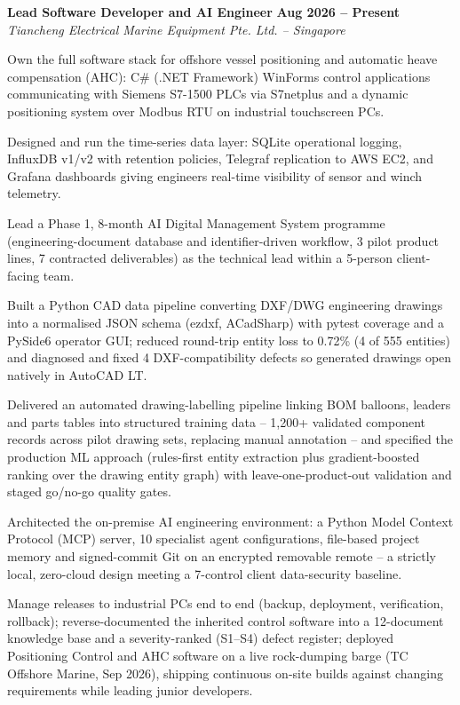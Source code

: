 \documentclass[letterpaper,10pt]{article}
\newcommand{\role}[4]{%
  \textbf{#1} \hfill \textbf{#3}\\
  \textit{#2} \hfill \textit{#4}\\[2pt]
}
\begin{document}
\role{Lead Software Developer and AI Engineer}
     {Tiancheng Electrical Marine Equipment Pte. Ltd. -- Singapore}
     {Aug 2026 -- Present}{}
\begin{tight}
  \item Own the full software stack for offshore vessel positioning and automatic heave
  compensation (AHC): C\# (.NET Framework) WinForms control applications communicating with
  Siemens S7-1500 PLCs via S7netplus and a dynamic positioning system over Modbus RTU on
  industrial touchscreen PCs.
  \item Designed and run the time-series data layer: SQLite operational logging, InfluxDB
  v1/v2 with retention policies, Telegraf replication to AWS EC2, and Grafana dashboards
  giving engineers real-time visibility of sensor and winch telemetry.
  \item Lead a Phase 1, 8-month AI Digital Management System programme (engineering-document
  database and identifier-driven workflow, 3 pilot product lines, 7 contracted deliverables)
  as the technical lead within a 5-person client-facing team.
  \item Built a Python CAD data pipeline converting DXF/DWG engineering drawings into a
  normalised JSON schema (ezdxf, ACadSharp) with pytest coverage and a PySide6 operator GUI;
  reduced round-trip entity loss to 0.72\% (4 of 555 entities) and diagnosed and fixed 4
  DXF-compatibility defects so generated drawings open natively in AutoCAD LT.
  \item Delivered an automated drawing-labelling pipeline linking BOM balloons, leaders and
  parts tables into structured training data -- 1,200+ validated component records across
  pilot drawing sets, replacing manual annotation -- and specified the production ML approach
  (rules-first entity extraction plus gradient-boosted ranking over the drawing entity graph)
  with leave-one-product-out validation and staged go/no-go quality gates.
  \item Architected the on-premise AI engineering environment: a Python Model Context
  Protocol (MCP) server, 10 specialist agent configurations, file-based project memory and
  signed-commit Git on an encrypted removable remote -- a strictly local, zero-cloud design
  meeting a 7-control client data-security baseline.
  \item Manage releases to industrial PCs end to end (backup, deployment, verification,
  rollback); reverse-documented the inherited control software into a 12-document knowledge
  base and a severity-ranked (S1--S4) defect register; deployed Positioning Control and AHC
  software on a live rock-dumping barge (TC Offshore Marine, Sep 2026), shipping continuous
  on-site builds against changing requirements while leading junior developers.
\end{tight}
\end{document}
